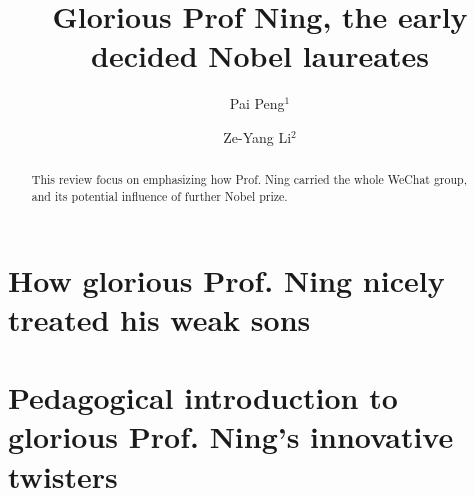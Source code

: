 \documentclass[11pt, twocolumn, rmp]{revtex4-1}   	%
\begin{document}
\title{Glorious Prof Ning, the early decided Nobel laureates}
\author{Pai Peng$^{1}$}
\author{Ze-Yang Li$^{2}$}
\begin{abstract}
This review focus on emphasizing how Prof. Ning carried the whole WeChat group, and its potential influence of further Nobel prize.  
\end{abstract}
\maketitle
\tableofcontents
\section{How glorious Prof. Ning nicely treated his weak sons}
\section{Pedagogical introduction to glorious Prof. Ning's innovative twisters}
\end{document}
